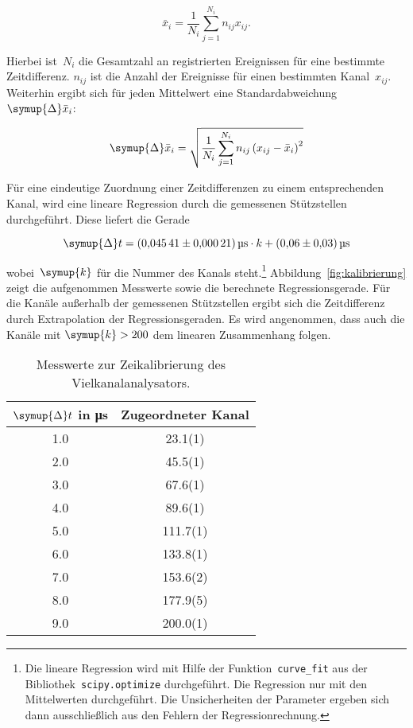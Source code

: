 \begin{equation}
  \bar{x}_i=\frac{1}{N_i}\sum_{j=1}^{N_i}n_{ij}x_{ij}.
  \label{eq:kanal_mittelwert}
\end{equation}

Hierbei ist~$N_i$ die Gesamtzahl an registrierten Ereignissen für eine bestimmte
Zeitdifferenz. $n_{ij}$ ist die Anzahl der Ereignisse für einen bestimmten
Kanal~$x_{ij}$. Weiterhin ergibt sich für jeden Mittelwert eine
Standardabweichung~$\symup{\Delta}\bar{x}_i$:

\begin{equation}
  \symup{\Delta}\bar{x}_i=\sqrt{\frac{1}{N_i}\sum_{j=1}^{N_i}n_{ij}\left(x_{ij}-\bar{x}_i\right)^2}
  \label{eq:kanal_standardabweichung}
\end{equation}

Für eine eindeutige Zuordnung einer Zeitdifferenzen zu einem entsprechenden Kanal,
wird eine lineare Regression durch die gemessenen Stützstellen durchgeführt. Diese
liefert die Gerade

\begin{equation}
  \symup{\Delta}t=\SI{0.04541(21)}{\micro\second}\cdot k+\SI{0.06(3)}{\micro\second}
  \label{eq:kalibrierung}
\end{equation}

wobei~$\symup{k}$ für die Nummer des Kanals steht.\footnote{Die lineare
Regression wird mit Hilfe der Funktion~\texttt{curve\_fit} aus der
Bibliothek~\texttt{scipy.optimize} durchgeführt. Die Regression nur mit den
Mittelwerten durchgeführt. Die Unsicherheiten der Parameter ergeben sich dann ausschließlich
aus den Fehlern der Regressionrechnung.} Abbildung~\ref{fig:kalibrierung} zeigt
die aufgenommen Messwerte sowie die berechnete Regressionsgerade. Für die Kanäle
außerhalb der gemessenen Stützstellen ergibt sich die Zeitdifferenz durch Extrapolation
der Regressionsgeraden. Es wird angenommen, dass auch die Kanäle mit $\symup{k}>200$
dem linearen Zusammenhang folgen.

\begin{table}[htb]
  \centering
  \caption{Messwerte zur Zeikalibrierung des Vielkanalanalysators.}
  \begin{tabular}{S[table-format = 2.1] S[table-format = 3.1(1)]}
    \toprule
    {$\symup{\Delta}t$ in \si{\micro\second}} & {Zugeordneter Kanal} \\
     &  23.1(1) \\
    2.0 &  45.5(1) \\
    3.0 &  67.6(1) \\
    4.0 &  89.6(1) \\
    5.0 & 111.7(1) \\
    6.0 & 133.8(1) \\
    7.0 & 153.6(2) \\
    8.0 & 177.9(5) \\
    9.0 & 200.0(1) \\
    \bottomrule
  \end{tabular}
  \label{tab:kalibrierung}
\end{table}

